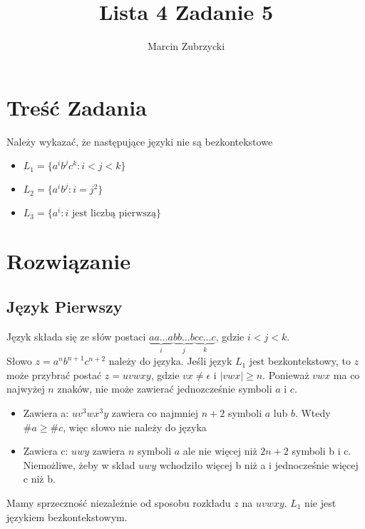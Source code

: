 \documentclass{article}
\title{Lista 4 Zadanie 5}
\author{Marcin Zubrzycki}
\begin{document}
\maketitle
\section{Treść Zadania}
Należy wykazać, że następujące języki nie są bezkontekstowe
\begin{itemize}
  \item $L_1 = \{a^ib^jc^k : i < j < k\}$
\item $L_2 = \{a^ib^j : i = j^2\}$
\item $L_3 = \{a^i : i \text{ jest liczbą pierwszą}\}$
\end{itemize}
\section{Rozwiązanie}
\subsection{Język Pierwszy}
Język składa się ze słów postaci $\underbrace{aa\hdots a}_{i}\underbrace{bb\hdots b}_{j}\underbrace{cc\hdots c}_{k}$, gdzie $i < j < k$. \\
Słowo $z = a^nb^{n+1}c^{n+2}$ należy do języka. Jeśli język $L_1$ jest bezkontekstowy, to $z$ może przybrać postać $z = uvwxy$, gdzie $vx \neq \epsilon$ i $|vwx| \geq n$.
Ponieważ $vwx$ ma co najwyżej $n$ znaków, nie może zawierać jednozcześnie symboli $a$ i $c$.
\begin{itemize}
\item Zawiera a: $uv^3wx^3y$ zawiera co najmniej $n+2$ symboli $a$ lub $b$. Wtedy $\#a \geq \#c$, więc słowo nie należy do języka
\item Zawiera c: $uwy$ zawiera $n$ symboli $a$ ale nie więcej niż $2n+2$ symboli b i c. Niemożliwe, żeby w skład $uwy$ wchodziło więcej b niż a i jednocześnie więcej c niż b.
\end{itemize}
Mamy sprzeczność niezależnie od sposobu rozkładu $z$ na $uvwxy$. $L_1$ nie jest językiem bezkontekstowym.
\end{document}
